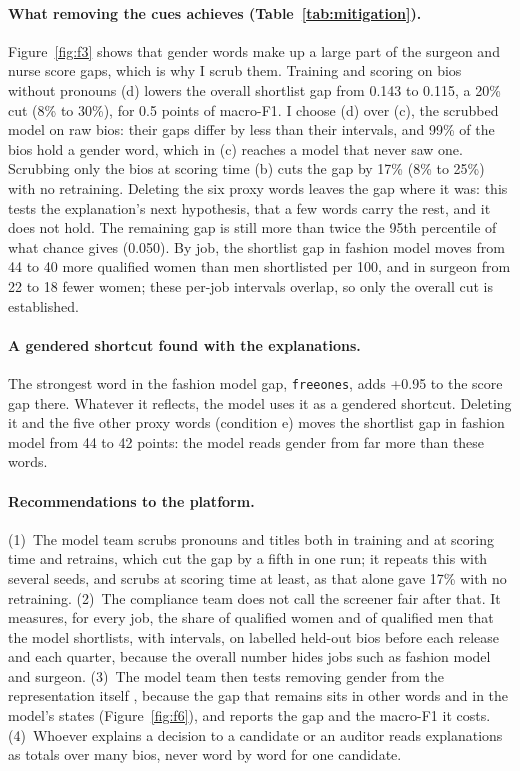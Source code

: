 \documentclass[11pt]{article}
\newcommand{\fig}[1]{Figure~\ref{fig:#1}}
\begin{document}
\paragraph{What removing the cues achieves (Table~\ref{tab:mitigation}).} \fig{f3} shows that gender words make up a large part of the surgeon and nurse score gaps, which is why I scrub them. Training and scoring on bios without pronouns (d) lowers the overall shortlist gap from 0.143 to 0.115, a 20\% cut (8\% to 30\%), for 0.5 points of macro-F1. I choose (d) over (c), the scrubbed model on raw bios: their gaps differ by less than their intervals, and 99\% of the bios hold a gender word, which in (c) reaches a model that never saw one. Scrubbing only the bios at scoring time (b) cuts the gap by 17\% (8\% to 25\%) with no retraining. Deleting the six proxy words leaves the gap where it was: this tests the explanation's next hypothesis, that a few words carry the rest, and it does not hold. The remaining gap is still more than twice the 95th percentile of what chance gives (0.050). By job, the shortlist gap in fashion model moves from 44 to 40 more qualified women than men shortlisted per 100, and in surgeon from 22 to 18 fewer women; these per-job intervals overlap, so only the overall cut is established.

\paragraph{A gendered shortcut found with the explanations.} The strongest word in the fashion model gap, \texttt{freeones}, adds +0.95 to the score gap there. Whatever it reflects, the model uses it as a gendered shortcut. Deleting it and the five other proxy words (condition e) moves the shortlist gap in fashion model from 44 to 42 points: the model reads gender from far more than these words.

\paragraph{Recommendations to the platform.} (1)~The model team scrubs pronouns and titles both in training and at scoring time and retrains, which cut the gap by a fifth in one run; it repeats this with several seeds, and scrubs at scoring time at least, as that alone gave 17\% with no retraining. (2)~The compliance team does not call the screener fair after that. It measures, for every job, the share of qualified women and of qualified men that the model shortlists, with intervals, on labelled held-out bios before each release and each quarter, because the overall number hides jobs such as fashion model and surgeon. (3)~The model team then tests removing gender from the representation itself \citep{ravfogel2020inlp,belrose2023leace}, because the gap that remains sits in other words and in the model's states (\fig{f6}), and reports the gap and the macro-F1 it costs. (4)~Whoever explains a decision to a candidate or an auditor reads explanations as totals over many bios, never word by word for one candidate.
\end{document}
